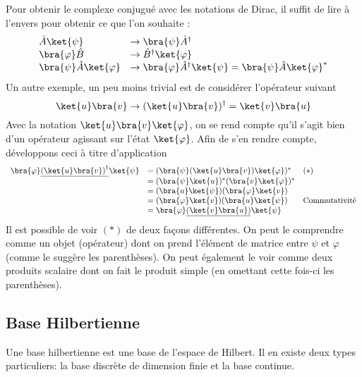 Pour obtenir le complexe conjugué avec les notations de Dirac, il suffit de lire à 
l'envers pour obtenir ce que l'on souhaite :
\begin{equation}
\begin{array}{ll}
\hat{A}\ket{\psi} &\rightarrow \bra{\psi}\hat{A}^\dagger\\
\bra{\varphi}\hat{B}&\rightarrow \hat{B}^\dagger \ket{\varphi}\\
\bra{\psi}\hat{A}\ket{\varphi} &\rightarrow  \bra{\varphi}\hat{A}^\dagger\ket{\psi} =
\bra{\psi}\hat{A}\ket{\varphi}^*
\end{array}
\end{equation}
Un autre exemple, un peu moins trivial est de considérer l'opérateur suivant
\begin{equation}
\ket{u}\bra{v} \rightarrow (\ket{u}\bra{v})^\dagger= \ket{v}\bra{u}
\end{equation}
Avec la notation $\ket{u}\bra{v}\ket{\varphi}$, on se rend 
compte qu'il s'agit bien d'un opérateur agissant sur l'état $\ket{\varphi}$. Afin de 
s'en rendre compte, développons ceci à titre d'application
\begin{equation}
\begin{array}{lll}
\bra{\varphi}\underline{\left(\ket{u}\bra{v}\right)^\dagger}\ket{\psi} &= (\bra{\psi}(\ket{u}\bra{v})
\ket{\varphi})^* & (*)\\
&=(\bra{\psi}\ket{u})^*(\bra{v}\ket{\varphi})^*\\
&=(\bra{u}\ket{\psi})(\bra{\varphi}\ket{v})\\
&=(\bra{\varphi}\ket{v})(\bra{u}\ket{\psi}) & \text{Commutativité}\\
&=\bra{\varphi}\underline{(\ket{v}\bra{u})}\ket{\psi}
\end{array}
\end{equation}
Il est possible de voir $(*)$ de deux façons différentes. On peut le comprendre comme 
un objet (opérateur) dont on prend l'élément de matrice entre $\psi$ et $\varphi$ (comme 
le suggère les parenthèses). On peut également le voir comme deux produits scalaire dont 
on fait le produit simple (en omettant cette fois-ci les parenthèses).


\subsection{Base Hilbertienne}
Une base hilbertienne est une base de l'espace de Hilbert. Il en existe deux types particuliers:
la base discrète de dimension finie et la base continue.

